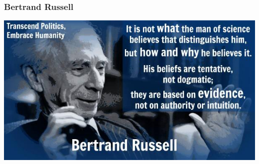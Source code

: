 \begin{frame}
  \frametitle{Bertrand Russell}
  \begin{center}
    \includegraphics[width=\textwidth]{images/bertrand}
  \end{center}
\end{frame}